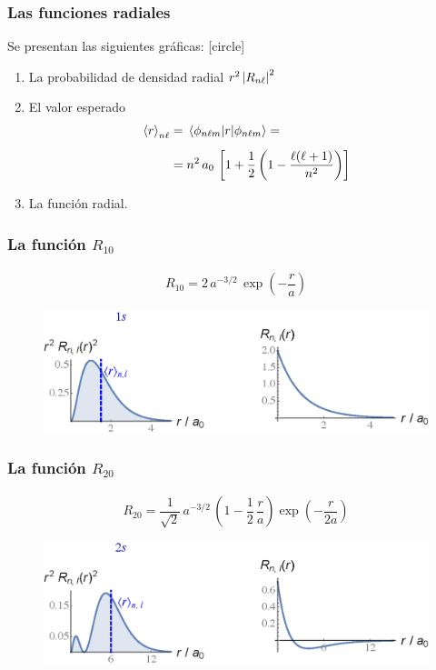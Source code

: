 \documentclass[12pt]{beamer}
\begin{document}
\begin{frame}
\frametitle{Las funciones radiales}
Se presentan las siguientes gráficas:
[circle]
\begin{enumerate}[<+->]
\item La probabilidad de densidad radial $r^{2} \, \abs{R_{n \ell}}^{2}$
\item El valor esperado
\begin{align*}
\expval{r}_{n \ell} &= \expval{r}{\phi_{n \ell m}} = \\[0.5em]
&= n^{2} \, a_{0} \, \left[ 1 + \dfrac{1}{2} \left( 1 - \dfrac{\ell (\ell + 1)}{n^{2}} \right) \right]
\end{align*}
\item La función radial.
\end{enumerate}
\end{frame}
\begin{frame}
\frametitle{La función $R_{10}$}
\begin{align*}
R_{10} = 2 \, a^{-3/2} \, \exp(-\dfrac{r}{a})
\end{align*}
\pause
\vspace*{-0.5cm}
\begin{figure}
   \centering
   \includegraphics[scale=0.65]{Imagenes/Plot_Funcion_Radial_10.eps}
\end{figure}
\end{frame}
\begin{frame}
\frametitle{La función $R_{20}$}
\begin{align*}
R_{20} = \dfrac{1}{\sqrt{2}} \, a^{-3/2} \, \left( 1 - \dfrac{1}{2} \, \dfrac{r}{a} \right)\exp(-\dfrac{r}{2a})
\end{align*}
\pause
\vspace*{-0.5cm}
\begin{figure}
   \centering
   \includegraphics[scale=0.67]{Imagenes/Plot_Funcion_Radial_20.eps}
\end{figure}
\end{frame}
\end{document}
